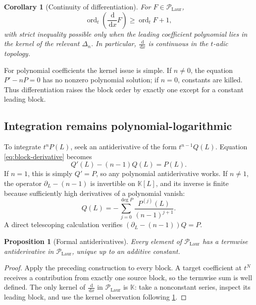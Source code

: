 \documentclass[11pt]{article}
\theoremstyle{pltheorem}
\newtheorem{proposition}[theorem]{Proposition}
\newtheorem{corollary}[theorem]{Corollary}
\newcommand{\K}{\mathbb K}
\newcommand{\PLL}{\mathscr P_{\mathrm{Laur}}}
\newcommand{\dd}{\,\mathrm d}
\newcommand{\ordt}{\operatorname{ord}_t}
\newcommand{\D}{\frac{\dd}{\dd x}}
\begin{document}
\begin{corollary}[Continuity of differentiation]\label{cor:D-continuous}
For \(F\in\PLL\),
\begin{equation}\label{eq:D-order}
 \ordt(\D F)\ge\ordt F+1,
\end{equation}
with strict inequality possible only when the leading coefficient polynomial lies in the kernel of the relevant \(\Delta_n\).  In particular, \(\D\) is continuous in the \(t\)-adic topology.
\end{corollary}

For polynomial coefficients the kernel issue is simple.  If \(n\ne0\), the equation \(P'-nP=0\) has no nonzero polynomial solution; if \(n=0\), constants are killed.  Thus differentiation raises the block order by exactly one except for a constant leading block.

\subsection{Integration remains polynomial-logarithmic}

To integrate \(t^nP(L)\), seek an antiderivative of the form
\(t^{n-1}Q(L)\).  Equation \cref{eq:block-derivative} becomes
\begin{equation}\label{eq:antiderivative-equation}
 Q'(L)-(n-1)Q(L)=P(L).
\end{equation}
If \(n=1\), this is simply \(Q'=P\), so any polynomial antiderivative works.  If \(n\ne1\), the operator
\(\partial_L-(n-1)\) is invertible on \(\K[L]\), and its inverse is finite because sufficiently high derivatives of a polynomial vanish:
\begin{equation}\label{eq:Delta-inverse-polynomial}
 Q(L)=-\sum_{j=0}^{\deg P}
 \frac{P^{(j)}(L)}{(n-1)^{j+1}}.
\end{equation}
A direct telescoping calculation verifies
\((\partial_L-(n-1))Q=P\).

\begin{proposition}[Formal antiderivatives]\label{prop:formal-antiderivatives}
Every element of \(\PLL\) has a termwise antiderivative in \(\PLL\), unique up to an additive constant.
\end{proposition}

\begin{proof}
Apply the preceding construction to every block.  A target coefficient at \(t^N\) receives a contribution from exactly one source block, so the termwise sum is well defined.  The only kernel of \(\D\) in \(\PLL\) is \(\K\): take a nonconstant series, inspect its leading block, and use the kernel observation following \cref{cor:D-continuous}.
\end{proof}
\end{document}
